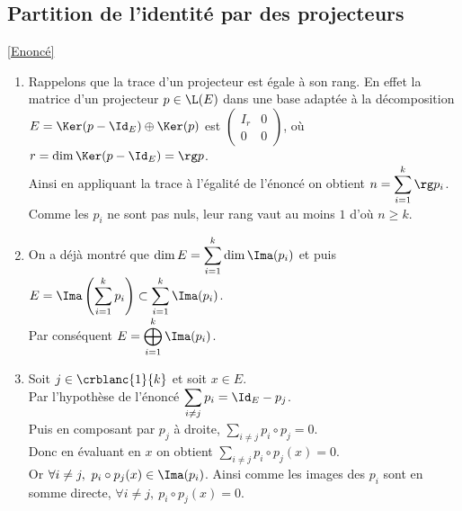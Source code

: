 \documentclass[8pt]{book}
\begin{document}
	\subsection{Partition de l'identité par des projecteurs }
	\label{Partition de l'identité par des projecteurs corrigé}
	\textcolor{blue}{\hyperref[Partition de l'identité par des projecteurs]{[Enoncé]}}\\
	\begin{enumerate}[leftmargin=*]
		\item Rappelons que la trace d'un projecteur est égale à son rang. En effet la matrice d'un projecteur $p\in \L(E)$ dans une base adaptée à la décomposition $E=\Ker(p-\Id_E)\oplus \Ker(p)$ est $\begin{pmatrix}
			I_r&0\\
			0&0
		\end{pmatrix}$, où $r=\dim\Ker(p-\Id_E)=\rg p$.\\
		Ainsi en appliquant la trace à l'égalité de l'énoncé on obtient $n=\displaystyle\sum_{i=1}^k\rg p_i$.\\
		Comme les $p_i$ ne sont pas nuls, leur rang vaut au moins $1$ d'où $n\geq k$.
		\item On a déjà montré que $\dim E=\displaystyle\sum_{i=1}^k\dim\Ima(p_i)$ et puis $E=\displaystyle\Ima\left(\sum_{i=1}^kp_i\right)\subset \sum_{i=1}^k\Ima(p_i)$.\\
		Par conséquent $E=\displaystyle\bigoplus_{i=1}^k\Ima(p_i)$.
		\item Soit $j\in \crblanc{1}{k}$ et soit $x\in E$.\\
		Par l'hypothèse de l'énoncé $\displaystyle\sum_{i\ne j}p_i=\Id_E-p_j$.\\
		Puis en composant par $p_j$ à droite, $\displaystyle\sum_{i\ne j}p_i\circ p_j=0$.\\
		Donc en évaluant en $x$ on obtient $\displaystyle\sum_{i\ne j}p_i\circ p_j(x)=0$.\\
		Or $\forall i\ne j,\ p_i\circ p_j(x)\in \Ima(p_i)$. Ainsi comme les images des $p_i$ sont en somme directe, $\forall i\ne j,\ p_i\circ p_j(x)=0$.
	\end{enumerate}
	
\end{document}
